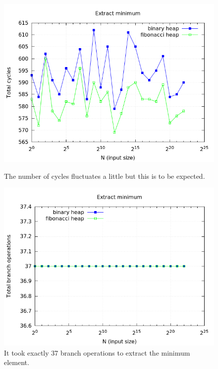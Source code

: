 \documentclass[a4paper,oneside,article,11pt]{memoir}
\begin{document}
\begin{figure}[H]
\centering
\begin{minipage}{0.48\columnwidth}
  \centering
  \includegraphics[width=\linewidth]{../res/findmin/extract_min_cycles.png}%
  \caption{The number of cycles fluctuates a little but this is to be expected.}
  \label{fig:findmin_cycles}
\end{minipage}%
\hfill
\begin{minipage}{0.48\columnwidth}
  \centering
  \includegraphics[width=\linewidth]{../res/findmin/extract_min_branch.png}%
  \caption{It took exactly 37 branch operations to extract the minimum element.}
  \label{fig:findmin_br}
\end{minipage}
\end{figure}
\end{document}
